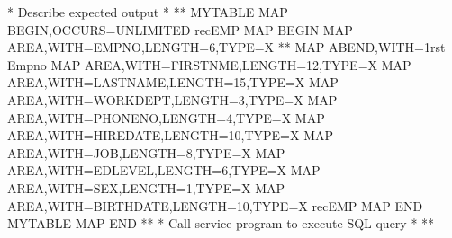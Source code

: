 \documentclass[letterpaper,10pt,english]{sphinxmanual}
\begin{document}
\begin{sphinxVerbatim}[commandchars=\\\{\}]
* Describe expected output                                            *
*\PYGZhy{}\PYGZhy{}\PYGZhy{}\PYGZhy{}\PYGZhy{}\PYGZhy{}\PYGZhy{}\PYGZhy{}\PYGZhy{}\PYGZhy{}\PYGZhy{}\PYGZhy{}\PYGZhy{}\PYGZhy{}\PYGZhy{}\PYGZhy{}\PYGZhy{}\PYGZhy{}\PYGZhy{}\PYGZhy{}\PYGZhy{}\PYGZhy{}\PYGZhy{}\PYGZhy{}\PYGZhy{}\PYGZhy{}\PYGZhy{}\PYGZhy{}\PYGZhy{}\PYGZhy{}\PYGZhy{}\PYGZhy{}\PYGZhy{}\PYGZhy{}\PYGZhy{}\PYGZhy{}\PYGZhy{}\PYGZhy{}\PYGZhy{}\PYGZhy{}\PYGZhy{}\PYGZhy{}\PYGZhy{}\PYGZhy{}\PYGZhy{}\PYGZhy{}\PYGZhy{}\PYGZhy{}\PYGZhy{}\PYGZhy{}\PYGZhy{}\PYGZhy{}\PYGZhy{}\PYGZhy{}\PYGZhy{}\PYGZhy{}\PYGZhy{}\PYGZhy{}\PYGZhy{}\PYGZhy{}\PYGZhy{}\PYGZhy{}\PYGZhy{}\PYGZhy{}\PYGZhy{}\PYGZhy{}\PYGZhy{}\PYGZhy{}\PYGZhy{}*
MYTABLE MAP\PYGZdl{} BEGIN,OCCURS=UNLIMITED
recEMP    MAP\PYGZdl{} BEGIN
     MAP\PYGZdl{} AREA,WITH=\PYGZsq{}EMPNO\PYGZsq{},LENGTH=6,TYPE=X
**   MAP\PYGZdl{} ABEND,WITH=\PYGZsq{}1rst Empno\PYGZsq{}
     MAP\PYGZdl{} AREA,WITH=\PYGZsq{}FIRSTNME\PYGZsq{},LENGTH=12,TYPE=X
     MAP\PYGZdl{} AREA,WITH=\PYGZsq{}LASTNAME\PYGZsq{},LENGTH=15,TYPE=X
     MAP\PYGZdl{} AREA,WITH=\PYGZsq{}WORKDEPT\PYGZsq{},LENGTH=3,TYPE=X
     MAP\PYGZdl{} AREA,WITH=\PYGZsq{}PHONENO\PYGZsq{},LENGTH=4,TYPE=X
     MAP\PYGZdl{} AREA,WITH=\PYGZsq{}HIREDATE\PYGZsq{},LENGTH=10,TYPE=X
     MAP\PYGZdl{} AREA,WITH=\PYGZsq{}JOB\PYGZsq{},LENGTH=8,TYPE=X
     MAP\PYGZdl{} AREA,WITH=\PYGZsq{}EDLEVEL\PYGZsq{},LENGTH=6,TYPE=X
     MAP\PYGZdl{} AREA,WITH=\PYGZsq{}SEX\PYGZsq{},LENGTH=1,TYPE=X
     MAP\PYGZdl{} AREA,WITH=\PYGZsq{}BIRTHDATE\PYGZsq{},LENGTH=10,TYPE=X
recEMP    MAP\PYGZdl{} END
MYTABLE MAP\PYGZdl{} END
*\PYGZhy{}\PYGZhy{}\PYGZhy{}\PYGZhy{}\PYGZhy{}\PYGZhy{}\PYGZhy{}\PYGZhy{}\PYGZhy{}\PYGZhy{}\PYGZhy{}\PYGZhy{}\PYGZhy{}\PYGZhy{}\PYGZhy{}\PYGZhy{}\PYGZhy{}\PYGZhy{}\PYGZhy{}\PYGZhy{}\PYGZhy{}\PYGZhy{}\PYGZhy{}\PYGZhy{}\PYGZhy{}\PYGZhy{}\PYGZhy{}\PYGZhy{}\PYGZhy{}\PYGZhy{}\PYGZhy{}\PYGZhy{}\PYGZhy{}\PYGZhy{}\PYGZhy{}\PYGZhy{}\PYGZhy{}\PYGZhy{}\PYGZhy{}\PYGZhy{}\PYGZhy{}\PYGZhy{}\PYGZhy{}\PYGZhy{}\PYGZhy{}\PYGZhy{}\PYGZhy{}\PYGZhy{}\PYGZhy{}\PYGZhy{}\PYGZhy{}\PYGZhy{}\PYGZhy{}\PYGZhy{}\PYGZhy{}\PYGZhy{}\PYGZhy{}\PYGZhy{}\PYGZhy{}\PYGZhy{}\PYGZhy{}\PYGZhy{}\PYGZhy{}\PYGZhy{}\PYGZhy{}\PYGZhy{}\PYGZhy{}\PYGZhy{}\PYGZhy{}*
* Call service program to execute SQL query                           *
*\PYGZhy{}\PYGZhy{}\PYGZhy{}\PYGZhy{}\PYGZhy{}\PYGZhy{}\PYGZhy{}\PYGZhy{}\PYGZhy{}\PYGZhy{}\PYGZhy{}\PYGZhy{}\PYGZhy{}\PYGZhy{}\PYGZhy{}\PYGZhy{}\PYGZhy{}\PYGZhy{}\PYGZhy{}\PYGZhy{}\PYGZhy{}\PYGZhy{}\PYGZhy{}\PYGZhy{}\PYGZhy{}\PYGZhy{}\PYGZhy{}\PYGZhy{}\PYGZhy{}\PYGZhy{}\PYGZhy{}\PYGZhy{}\PYGZhy{}\PYGZhy{}\PYGZhy{}\PYGZhy{}\PYGZhy{}\PYGZhy{}\PYGZhy{}\PYGZhy{}\PYGZhy{}\PYGZhy{}\PYGZhy{}\PYGZhy{}\PYGZhy{}\PYGZhy{}\PYGZhy{}\PYGZhy{}\PYGZhy{}\PYGZhy{}\PYGZhy{}\PYGZhy{}\PYGZhy{}\PYGZhy{}\PYGZhy{}\PYGZhy{}\PYGZhy{}\PYGZhy{}\PYGZhy{}\PYGZhy{}\PYGZhy{}\PYGZhy{}\PYGZhy{}\PYGZhy{}\PYGZhy{}\PYGZhy{}\PYGZhy{}\PYGZhy{}\PYGZhy{}*

\end{sphinxVerbatim}
\end{document}
